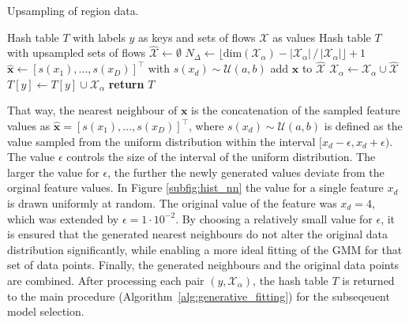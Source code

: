\documentclass[../../main.tex]{subfiles}
\begin{document}
 \begin{algorithm}
    \caption[Upsampling of region data]{Upsampling of region data.}
    \label{alg:upsampling}
 
    \begin{algorithmic}[1]
        \REQUIRE Hash table $T$ with labels $y$ as keys and sets of flows $\mathcal{X}$ as values
        \ENSURE Hash table $T$ with upsampled sets of flows
                \STATE $\hat{\mathcal{X}} \leftarrow \emptyset$
                \STATE $N_\Delta \leftarrow \lfloor \text{dim}(\mathcal{X}_\alpha) - |\mathcal{X}_\alpha| \, / \, |\mathcal{X}_\alpha| \rfloor + 1 $
                        \STATE $\hat{\bm{x}} \leftarrow [s(x_1), \dots, s(x_D)]^\top$ with $s(x_d) \sim \mathcal{U}(a, b)$
                        \STATE add $\hat{\bm{x}}$ to $\hat{\mathcal{X}}$
                    \ENDFOR
                \ENDFOR
                \STATE $\mathcal{X}_\alpha \leftarrow \mathcal{X}_\alpha \cup \hat{\mathcal{X}}$
                \STATE $T[y] \leftarrow T[y] \cup \mathcal{X}_\alpha$ 
            \ENDIF
        \ENDFOR
        \STATE \textbf{return} $T$
    \end{algorithmic}
 \end{algorithm}
 
 That way, the nearest neighbour of $\bm{x}$ is the concatenation of the sampled feature values as $\hat{\bm{x}} = [s(x_1), \dots, s(x_D)]^\top$, where $s(x_d) \sim \mathcal{U}(a, b)$ is defined as the value sampled from the uniform distribution within the interval $[x_d-\epsilon, x_d+\epsilon)$. The value $\epsilon$ controls the size of the interval of the uniform distribution. The larger the value for $\epsilon$, the further the newly generated values deviate from the orginal feature values. In Figure \ref{subfig:hist_nn} the value for a single feature $x_d$ is drawn uniformly at random. The original value of the feature was $x_d=4$, which was extended by $\epsilon=1\cdot10^{-2}$. By choosing a relatively small value for $\epsilon$, it is ensured that the generated nearest neighbours do not alter the original data distribution significantly, while enabling a more ideal fitting of the GMM for that set of data points. Finally, the generated neighbours and the original data points are combined. After processing each pair $(y, \mathcal{X}_\alpha)$, the hash table $T$ is returned to the main procedure (Algorithm~\ref{alg:generative_fitting}) for the subseqeuent model selection.
\end{document}
